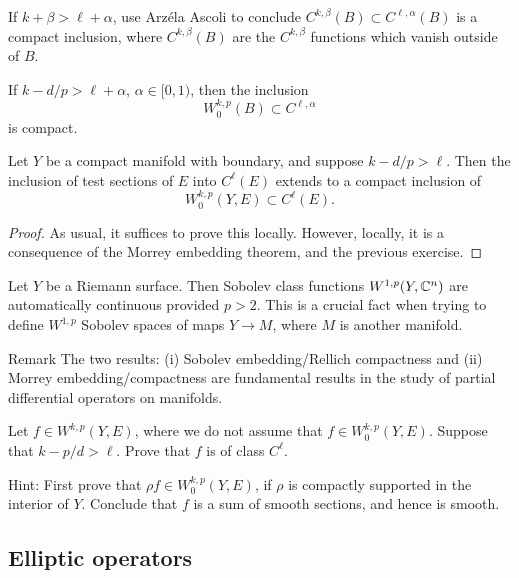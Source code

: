 \documentclass{amsart}
\begin{document}
\begin{xca}
  If $k+\beta>\ell+\alpha$, use Arz\'ela Ascoli to conclude $C^{k,\beta}(B)\subset C^{\ell,\alpha}(B)$ is a compact inclusion, where $C^{k,\beta}(B)$ are the $C^{k,\beta}$ functions which vanish outside of $B$.
\end{xca}
\begin{xca}
  If $k-d/p>\ell+\alpha$, $\alpha\in [0,1)$, then the inclusion
  \begin{equation*}
    W^{k,p}_{0}(B)\subset C^{\ell,\alpha}
  \end{equation*}
  is compact. 
\end{xca}
\begin{cor}
  Let $Y$ be a compact manifold with boundary, and suppose $k-d/p>\ell$. Then the inclusion of test sections of $E$ into $C^{\ell}(E)$ extends to a compact inclusion of $$W^{k,p}_{0}(Y,E)\subset C^{\ell}(E).$$
\end{cor}
\begin{proof}
  As usual, it suffices to prove this locally. However, locally, it is a consequence of the Morrey embedding theorem, and the previous exercise.
\end{proof}
\begin{example}
  Let $Y$ be a Riemann surface. Then Sobolev class functions $W^{1,p}(Y,\mathbb{C}^{n})$ are automatically continuous provided $p>2$. This is a crucial fact when trying to define $W^{1,p}$ Sobolev spaces of maps $Y\to M$, where $M$ is another manifold.
\end{example}
\begin{clear}{Remark}
  The two results: (i) Sobolev embedding/Rellich compactness and (ii) Morrey embedding/compactness are fundamental results in the study of partial differential operators on manifolds.
\end{clear}
\begin{xca}
  Let $f\in W^{k,p}(Y,E)$, where we do not assume that $f\in W^{k,p}_{0}(Y,E)$. Suppose that $k-p/d>\ell$. Prove that $f$ is of class $C^{\ell}$.

  Hint: First prove that $\rho f\in W^{k,p}_{0}(Y,E)$, if $\rho$ is compactly supported in the interior of $Y$. Conclude that $f$ is a sum of smooth sections, and hence is smooth. 
\end{xca}
\clearpage

\subsection*{Elliptic operators}
\end{document}
